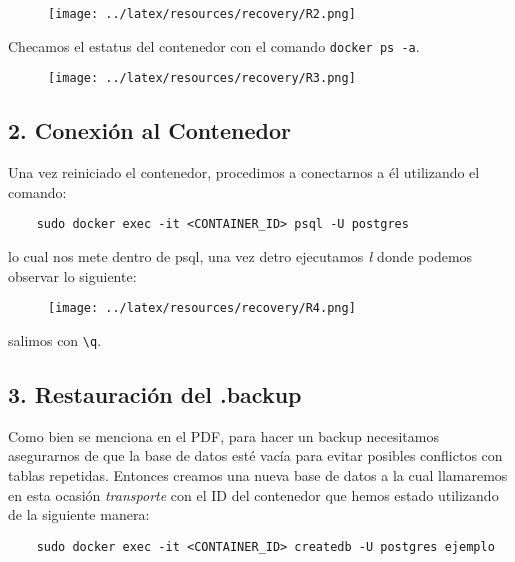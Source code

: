 \begin{figure}[h]
    \centering
        \texttt{[image: ../latex/resources/recovery/R2.png]}
    \end{figure}

Checamos el estatus del contenedor con el comando \texttt{docker ps -a}. \\

\begin{figure}[h]
    \centering
        \texttt{[image: ../latex/resources/recovery/R3.png]}
    \end{figure}

\subsection*{2. Conexión al Contenedor}

Una vez reiniciado el contenedor, procedimos a conectarnos a él utilizando el comando: \\

\begin{verbatim}
    sudo docker exec -it <CONTAINER_ID> psql -U postgres
\end{verbatim}

lo cual nos mete dentro de psql, una vez detro ejecutamos \textit{\l} donde podemos observar lo siguiente: \\

\begin{figure}[h]
    \centering
        \texttt{[image: ../latex/resources/recovery/R4.png]}
\end{figure}

salimos con \texttt{\textbackslash q}.

\subsection*{3. Restauración del .backup}

Como bien se menciona en el PDF, para hacer un backup necesitamos asegurarnos de que la base de datos esté vacía para evitar posibles conflictos con tablas repetidas. Entonces creamos una nueva base de datos a la cual llamaremos en esta ocasión \textit{transporte} con el ID del contenedor que hemos estado utilizando de la siguiente manera: \\

\begin{verbatim}
    sudo docker exec -it <CONTAINER_ID> createdb -U postgres ejemplo
\end{verbatim}

